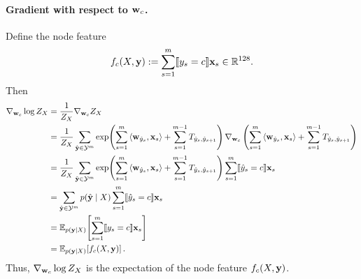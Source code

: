 \documentclass[11pt]{report}
\begin{document}
\paragraph{Gradient with respect to $\mathbf{\boldsymbol{w}}_c$.}
Define the node feature
\begin{align}
f_c(X,\mathbf{\boldsymbol{y}})
:=
\sum_{s=1}^m \llbracket y_s = c \rrbracket \mathbf{\boldsymbol{x}}_s
\in \mathbb{R}^{128}.
\end{align}
Then
\begin{align}
{\nabla}_{\mathbf{\boldsymbol{w}}_c}\log Z_X
&=
\frac{1}{Z_X}{\nabla}_{\mathbf{\boldsymbol{w}}_c} Z_X \\
&=
\frac{1}{Z_X}
\sum_{\hat{\mathbf{\boldsymbol{y}}}\in\mathcal{Y}^m}
\exp\!\left(
\sum_{s=1}^m \left\langle \mathbf{\boldsymbol{w}}_{\hat y_s},\mathbf{\boldsymbol{x}}_s \right\rangle
+
\sum_{s=1}^{m-1} T_{\hat y_s,\hat y_{s+1}}
\right)
{\nabla}_{\mathbf{\boldsymbol{w}}_c}
\left(
\sum_{s=1}^m \left\langle \mathbf{\boldsymbol{w}}_{\hat y_s},\mathbf{\boldsymbol{x}}_s \right\rangle
+
\sum_{s=1}^{m-1} T_{\hat y_s,\hat y_{s+1}}
\right) \\
&=
\frac{1}{Z_X}
\sum_{\hat{\mathbf{\boldsymbol{y}}}\in\mathcal{Y}^m}
\exp\!\left(
\sum_{s=1}^m \left\langle \mathbf{\boldsymbol{w}}_{\hat y_s},\mathbf{\boldsymbol{x}}_s \right\rangle
+
\sum_{s=1}^{m-1} T_{\hat y_s,\hat y_{s+1}}
\right)
\sum_{s=1}^m \llbracket \hat y_s = c \rrbracket \mathbf{\boldsymbol{x}}_s \\
&=
\sum_{\hat{\mathbf{\boldsymbol{y}}}\in\mathcal{Y}^m}
p(\hat{\mathbf{\boldsymbol{y}}}\mid X)
\sum_{s=1}^m \llbracket \hat y_s = c \rrbracket \mathbf{\boldsymbol{x}}_s \\
&=
\mathbb{E}_{p(\mathbf{\boldsymbol{y}}\mid X)}\!\left[
\sum_{s=1}^m \llbracket y_s = c \rrbracket \mathbf{\boldsymbol{x}}_s
\right] \\
&=
\mathbb{E}_{p(\mathbf{\boldsymbol{y}}\mid X)}\!\left[f_c(X,\mathbf{\boldsymbol{y}})\right].
\end{align}
Thus, ${\nabla}_{\mathbf{\boldsymbol{w}}_c}\log Z_X$ is the expectation of the node feature $f_c(X,\mathbf{\boldsymbol{y}})$.
\end{document}
